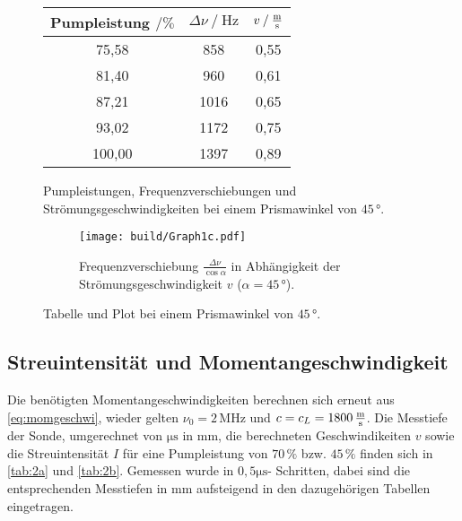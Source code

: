\begin{figure}
    \begin{subtable}{0.43\textwidth}
        \centering
       \begin{tabular}{c c c}
        \toprule 
        {Pumpleistung $\mathbin{/}\%$} & {$\Delta \nu \mathbin{/} \unit{\hertz}$} & {$v \mathbin{/} \unit{\frac{\meter}{\second}}$}  \\
        \midrule 
                 75,58     &     858   & 0,55 \\
                 81,40     &     960   & 0,61 \\
                 87,21     &     1016  & 0,65 \\
                 93,02     &     1172  & 0,75 \\
                100,00     &     1397  & 0,89 \\
        \bottomrule
       \end{tabular}
       \caption{Pumpleistungen, Frequenzverschiebungen und Strömungsgeschwindigkeiten bei einem Prismawinkel von $45 \,°$.}
        \label{tab:1winkel3}
    \end{subtable}
    \begin{subfigure}{0.57\textwidth} 
        \centering
        \texttt{[image: build/Graph1c.pdf]}  
        \caption{Frequenzverschiebung $\frac{\Delta \nu}{\cos\alpha}$ in Abhängigkeit der Strömungsgeschwindigkeit $v$ ($\alpha = 45 \,°$).}
        \label{fig:graph1c}
        \qquad
    \end{subfigure}
    \caption{Tabelle und Plot bei einem Prismawinkel von $45 \,°$.} 
\end{figure}    

\subsection{Streuintensität und Momentangeschwindigkeit}

Die benötigten Momentangeschwindigkeiten berechnen sich erneut aus \eqref{eq:momgeschwi}, wieder gelten $\nu_0 = 2 \,\unit{\mega\hertz}$ und $c = c_L = 1800 \,\unit{\frac{\meter}{\second}}$.
Die Messtiefe der Sonde, umgerechnet von $\unit{\micro\second}$ in $\unit{\milli\meter}$, die berechneten Geschwindikeiten $v$ sowie die Streuintensität $I$ für eine Pumpleistung von $70 \,\%$ bzw. $45 \,\%$ finden sich in \autoref{tab:2a} und \autoref{tab:2b}.
Gemessen wurde in $0,5 \unit{\micro\second}$- Schritten, dabei sind die entsprechenden Messtiefen in $\unit{\milli\meter}$ aufsteigend in den dazugehörigen Tabellen eingetragen. \\

